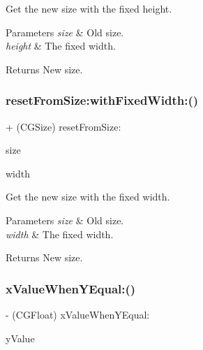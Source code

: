 Get the new size with the fixed height.


\begin{DoxyParams}{Parameters}
{\em size} & Old size. \\
\hline
{\em height} & The fixed width.\\
\hline
\end{DoxyParams}
\begin{DoxyReturn}{Returns}
New size. 
\end{DoxyReturn}
\mbox{\label{interface_math_ab968ff10f3cf143ebbd8f6c5cf9c196a}} 
\subsubsection{\texorpdfstring{reset\+From\+Size\+:with\+Fixed\+Width\+:()}{resetFromSize:withFixedWidth:()}}
{\footnotesize\ttfamily + (C\+G\+Size) reset\+From\+Size\+: \begin{DoxyParamCaption}\item[{(C\+G\+Size)}]{size }\item[{withFixedWidth:(C\+G\+Float)}]{width }\end{DoxyParamCaption}}

Get the new size with the fixed width.


\begin{DoxyParams}{Parameters}
{\em size} & Old size. \\
\hline
{\em width} & The fixed width.\\
\hline
\end{DoxyParams}
\begin{DoxyReturn}{Returns}
New size. 
\end{DoxyReturn}
\mbox{\label{interface_math_a1f506725e2e40cde48a7438935ea22e8}} 
\subsubsection{\texorpdfstring{x\+Value\+When\+Y\+Equal\+:()}{xValueWhenYEqual:()}}
{\footnotesize\ttfamily -\/ (C\+G\+Float) x\+Value\+When\+Y\+Equal\+: \begin{DoxyParamCaption}\item[{(C\+G\+Float)}]{y\+Value }\end{DoxyParamCaption}}

